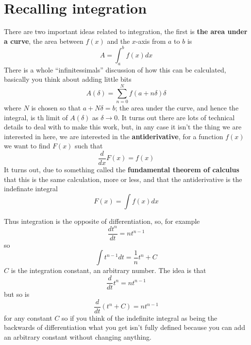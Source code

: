 \documentclass[12pt]{article}
\begin{document}
\section*{Recalling integration}

There are two important ideas related to integration, the first is
\textbf{the area under a curve}, the area between $f(x)$ and the
$x$-axis from $a$ to $b$ is
\begin{equation}
  A=\int_a^bf(x)dx
\end{equation}
There is a whole ``infinitessimals'' discussion of how this can be calculated, basically you think about adding little bits
\begin{equation}
  A(\delta)=\sum_{n=0}^Nf(a+n\delta)\delta
\end{equation}
where $N$ is chosen so that $a+N\delta=b$; the area under the curve, and hence the integral, is th limit of $A(\delta)$ as $\delta\rightarrow 0$. It turns out there are lots of technical details to deal with to make this work, but, in any case it isn't the thing we are interested in here, we are interested in the \textbf{antiderivative}, for a function $f(x)$ we want to find $F(x)$ such that
\begin{equation}
  \frac{d}{dx}F(x)=f(x)
\end{equation}
It turns out, due to something called the \textbf{fundamental theorem of calculus} that this is the same calculation, more or less, and that the antiderivative is the indefinate integral
\begin{equation}
  F(x)=\int f(x)dx
\end{equation}

Thus integration is the opposite of differentiation, so, for example
\begin{equation}
  \frac{dt^n}{dt}=nt^{n-1}
\end{equation}
so
\begin{equation}
  \int t^{n-1}dt=\frac{1}{n}t^n+C
\end{equation}
$C$ is the integration constant, an arbitrary number. The idea is that
\begin{equation}
  \frac{d}{dt}t^n=nt^{n-1}
\end{equation}
but so is
\begin{equation}
  \frac{d}{dt}\left(t^n+C\right)=nt^{n-1}
\end{equation}
for any constant $C$ so if you think of the indefinite integral as
being the backwards of differentiation what you get isn't fully defined because you can add an arbitrary constant without changing anything.
\end{document}
